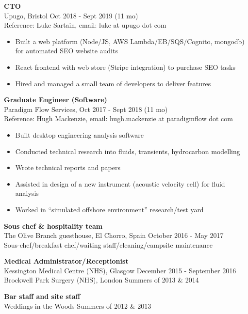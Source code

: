 \documentclass[overlap, line, 10pt]{res} %
\begin{document}
\begin{resume}
\textbf{CTO}\\
Upugo, Bristol Oct 2018 - Sept 2019 (11 mo)\\
Reference: Luke Sartain, email: luke at upugo dot com

\begin{itemize} \itemsep -1pt %
\item Built a web platform (Node/JS, AWS Lambda/EB/SQS/Cognito, mongodb) for automated SEO website audits
\item React frontend with web store (Stripe integration) to purchase SEO tasks
\item Hired and managed a small team of developers to deliver features 

\end{itemize}

\textbf{Graduate Engineer (Software)}\\
Paradigm Flow Services, Oct 2017 - Sept 2018 (11 mo)\\
Reference: Hugh Mackenzie, email: hugh.mackenzie at paradigmflow dot com

\begin{itemize} \itemsep -1pt %
\item Built desktop engineering analysis software
\item Conducted technical research into fluids, transients, hydrocarbon modelling
\item Wrote technical reports and papers
\item Assisted in design of a new instrument (acoustic velocity cell) for fluid analysis
\item Worked in ``simulated offshore environment'' research/test yard
\end{itemize}

\textbf{Sous chef \& hospitality team} \\
The Olive Branch guesthouse, El Chorro, Spain October 2016 - May 2017\\
Sous-chef/breakfast chef/waiting staff/cleaning/campsite maintenance

\textbf{Medical Administrator/Receptionist} \\
Kessington Medical Centre (NHS), Glasgow \hfill December 2015 - September 2016\\
Brockwell Park Surgery (NHS), London \hfill Summers of 2013 \& 2014
 
\textbf{Bar staff and site staff} \\
Weddings in the Woods \hfill Summers of 2012 \& 2013

\end{resume}
\end{document}
